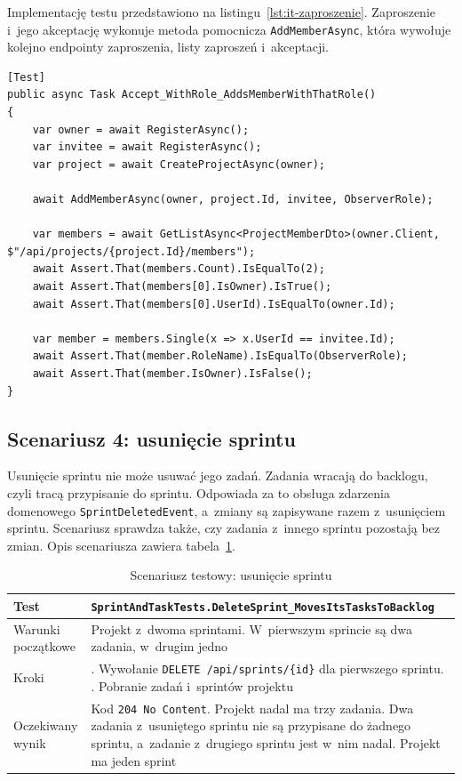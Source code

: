 Implementację testu przedstawiono na listingu~\ref{lst:it-zaproszenie}. Zaproszenie i~jego akceptację wykonuje metoda
pomocnicza \texttt{AddMemberAsync}, która wywołuje kolejno endpointy zaproszenia, listy zaproszeń i~akceptacji.

\begin{lstlisting}[basicstyle=\footnotesize\ttfamily, captionpos=t, caption={Test dołączenia do projektu z~wybraną rolą}, label={lst:it-zaproszenie}]
[Test]
public async Task Accept_WithRole_AddsMemberWithThatRole()
{
    var owner = await RegisterAsync();
    var invitee = await RegisterAsync();
    var project = await CreateProjectAsync(owner);

    await AddMemberAsync(owner, project.Id, invitee, ObserverRole);

    var members = await GetListAsync<ProjectMemberDto>(owner.Client, $"/api/projects/{project.Id}/members");
    await Assert.That(members.Count).IsEqualTo(2);
    await Assert.That(members[0].IsOwner).IsTrue();
    await Assert.That(members[0].UserId).IsEqualTo(owner.Id);

    var member = members.Single(x => x.UserId == invitee.Id);
    await Assert.That(member.RoleName).IsEqualTo(ObserverRole);
    await Assert.That(member.IsOwner).IsFalse();
}
\end{lstlisting}

\subsection{Scenariusz 4: usunięcie sprintu}
Usunięcie sprintu nie może usuwać jego zadań. Zadania wracają do backlogu, czyli tracą przypisanie do sprintu. Odpowiada
za to obsługa zdarzenia domenowego \texttt{SprintDeletedEvent}, a~zmiany są zapisywane razem z~usunięciem sprintu.
Scenariusz sprawdza także, czy zadania z~innego sprintu pozostają bez zmian. Opis scenariusza zawiera tabela~\ref{tab:it-sprint}.

\begin{table}[htb]
    \centering
    \caption{Scenariusz testowy: usunięcie sprintu}
    \label{tab:it-sprint}
    \small
    \begin{tabularx}{\linewidth}{@{}>{\raggedright\arraybackslash}p{3.5cm} >{\raggedright\arraybackslash}X@{}}
        \hline
        Test & \texttt{SprintAndTaskTests.\allowbreak{}DeleteSprint\_\allowbreak{}MovesItsTasksToBacklog} \\ \hline
        Warunki początkowe & Projekt z~dwoma sprintami. W~pierwszym sprincie są dwa zadania, w~drugim jedno \\ \hline
        Kroki & 1. Wywołanie \texttt{DELETE /api/sprints/\{id\}} dla pierwszego sprintu. \newline 2. Pobranie zadań i~sprintów projektu \\ \hline
        Oczekiwany wynik & Kod \texttt{204 No Content}. Projekt nadal ma trzy zadania. Dwa zadania z~usuniętego sprintu nie są przypisane do żadnego sprintu, a~zadanie z~drugiego sprintu jest w~nim nadal. Projekt ma jeden sprint \\ \hline
    \end{tabularx}
\end{table}

